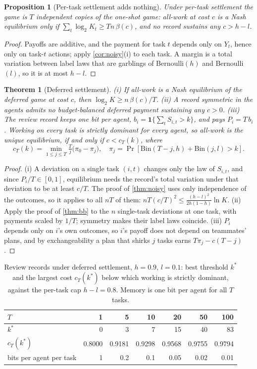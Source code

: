 \documentclass[sigconf,anonymous,acmthm=false]{acmart}
\theoremstyle{acmplain}
\newtheorem{theorem}{Theorem}
\newtheorem{proposition}{Proposition}
\theoremstyle{acmdefinition}
\begin{document}
\begin{proposition}[Per-task settlement adds nothing]\label{prop:pertask}
Under per-task settlement the game is $T$ independent copies of the one-shot game: all-work at
cost $c$ is a Nash equilibrium only if $\sum_t\log_2K_t\ge Tn\,\beta(c)$, and no record
sustains any $c>h-l$.
\end{proposition}
\begin{proof}
Payoffs are additive, and the payment for task $t$ depends only on $Y_t$, hence only on
task-$t$ actions; apply \cref{cor:noisy}(i) to each task. A margin is a total variation
between label laws that are garblings of Bernoulli$(h)$ and Bernoulli$(l)$, so it is at most
$h-l$.
\end{proof}

\begin{theorem}[Deferred settlement]\label{thm:deferred}
(i) If all-work is a Nash equilibrium of the deferred game at cost $c$, then
$\log_2K\ge n\,\beta(c)/T$. (ii) A record symmetric in the agents admits no budget-balanced
deferred payment sustaining any $c>0$. (iii) The \emph{review record} keeps one bit per agent,
$b_i=\mathbf1\{\sum_tS_{i,t}>k\}$, and pays $P_i=T\,b_i$. Working on every task is strictly
dominant for every agent, so all-work is the unique equilibrium, if and only if $c<c_T(k)$,
where
\[ c_T(k)=\min_{1\le j\le T}\tfrac Tj\big(\pi_0-\pi_j\big),\quad
\pi_j=\Pr[\mathrm{Bin}(T{-}j,h)+\mathrm{Bin}(j,l)>k]. \]
\end{theorem}
\begin{proof}
(i) A deviation on a single task $(i,t)$ changes only the law of $S_{i,t}$, and since
$P_i/T\in[0,1]$, equilibrium needs the record's total variation under that deviation to be at
least $c/T$. The proof of \cref{thm:noisy} uses only independence of the outcomes, so it
applies to all $nT$ of them: $nT(c/T)^2\le\frac{(h-l)^2}{2h(1-h)}\ln K$. (ii) Apply the proof
of \cref{thm:bb} to the $n$ single-task deviations at one task, with payments scaled by
$1/T$; symmetry makes their label laws coincide. (iii) $P_i$ depends only on $i$'s own
outcomes, so $i$'s payoff does not depend on teammates' plans, and by exchangeability a plan
that shirks $j$ tasks earns $T\pi_j-c(T-j)$.
\end{proof}

\begin{table}[t]
\caption{Review records under deferred settlement, $h=0.9$, $l=0.1$: best threshold $k^*$ and
the largest cost $c_T(k^*)$ below which working is strictly dominant, against the per-task cap
$h-l=0.8$. Memory is one bit per agent for all $T$ tasks.}
\label{tab:review}
\footnotesize
\begin{tabular}{@{}lrrrrrr@{}}
\toprule
$T$ & 1 & 5 & 10 & 20 & 50 & 100\\
\midrule
$k^*$ & 0 & 3 & 7 & 15 & 40 & 83\\
$c_T(k^*)$ & 0.8000 & 0.9181 & 0.9298 & 0.9568 & 0.9755 & 0.9794\\
bits per agent per task & 1 & 0.2 & 0.1 & 0.05 & 0.02 & 0.01\\
\bottomrule
\end{tabular}
\end{table}
\end{document}
